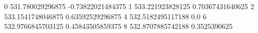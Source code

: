 0 531.780029296875 -0.73822021484375
1 533.221923828125 0.70367431640625
2 533.1541748046875 0.63592529296875
4 532.5182495117188 0.0
6 532.9766845703125 0.45843505859375
8 532.8707885742188 0.3525390625
